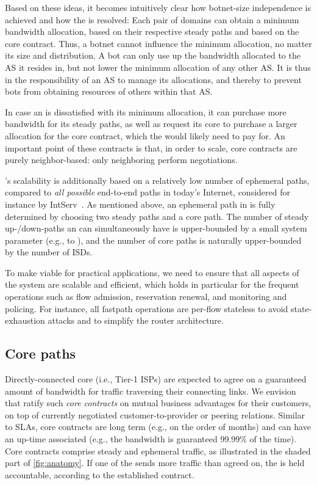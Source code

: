 Based on these ideas, it becomes intuitively clear how botnet-size independence
is achieved and how the \tragedy is resolved: Each pair of domains can obtain a
minimum bandwidth allocation, based on their respective steady paths and based
on the core contract. Thus, a botnet cannot influence the minimum allocation,
no matter its size and distribution. A bot can only use up the bandwidth
allocated to the AS it resides in, but not lower the minimum allocation of any
other AS. It is thus in the responsibility of an AS to manage its allocations,
and thereby to prevent bots from obtaining resources of others within that AS.

In case an \AD is dissatisfied with its minimum allocation, it can purchase
more bandwidth for its steady paths, as well as request its core \AD to
purchase a larger allocation for the core contract, which the \AD would likely
need to pay for. An important point of these contracts is that, in order to
scale, core contracts are purely neighbor-based: only neighboring \ADs perform
negotiations.

\name's scalability is additionally based on a relatively low number of
ephemeral paths, compared to \emph{all possible} end-to-end paths in today's
Internet, considered for instance by IntServ~\cite{intserv}. As mentioned
above, an ephemeral path in \name is fully determined by choosing two steady
paths and a core path. The number of steady up-/down-paths an \AD can
simultaneously have is upper-bounded by a small \name system parameter (e.g.,
 to ), and the number of core paths is naturally upper-bounded by the
number of ISDs.

To make \name viable for practical applications, we need to ensure that all
aspects of the system are scalable and efficient, which holds in particular for
the frequent operations such as flow admission, reservation renewal, and
monitoring and policing.
For instance, all fastpath operations are per-flow stateless to avoid
state-exhaustion attacks and to simplify the router architecture.


\subsection{Core paths}
\label{sec:corepaths}

\noindent
Directly-connected core \ADs (i.e., Tier-1 ISPs) are expected to agree on a
guaranteed amount of bandwidth for traffic traversing their connecting links.
We envision that \ADs ratify such \emph{core contracts} on mutual business
advantages for their customers, on top of currently negotiated
customer-to-provider or peering relations. Similar to SLAs, core contracts are
long term (e.g., on the order of months) and can have an up-time associated
(e.g., the bandwidth is guaranteed 99.99\% of the time). Core contracts
comprise steady and ephemeral traffic, as illustrated in the shaded part of
\autoref{fig:anatomy}.
If one of the \ADs sends more traffic than agreed on, the \AD is held
accountable, according to the established contract.

